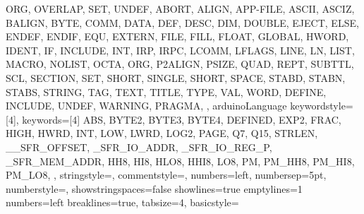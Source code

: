 {{                ORG, OVERLAP,
                SET,
                UNDEF, 
                ABORT, ALIGN, APP-FILE, ASCII, ASCIZ, 
                BALIGN, BYTE, 
                COMM, 
                DATA, DEF, DESC, DIM, DOUBLE, 
                EJECT, ELSE, ENDEF, ENDIF, EQU, EXTERN, 
                FILE, FILL, FLOAT, 
                GLOBAL, 
                HWORD,
                IDENT, IF, INCLUDE, INT, IRP, IRPC, 
                LCOMM, LFLAGS, LINE, LN, LIST, 
                MACRO,
                NOLIST, 
                OCTA, ORG, 
                P2ALIGN, PSIZE, 
                QUAD, 
                REPT, 
                SUBTTL, SCL, SECTION, SET, SHORT, 
                SINGLE, SHORT, SPACE, STABD, STABN, 
                STABS, STRING, 
                TAG, TEXT, TITLE, TYPE, 
                VAL, 
                WORD,
                DEFINE, INCLUDE, UNDEF, WARNING, PRAGMA, 
                },      arduinoLanguage
%
%
  keywordstyle=[4]\color{arduinoGreen},
  keywords=[4]{  %
                ABS, 
                BYTE2, BYTE3, BYTE4, 
                DEFINED,
                EXP2,
                FRAC, 
                HIGH, HWRD, 
                INT,
                LOW, LWRD, LOG2, 
                PAGE, 
                Q7, Q15, 
                STRLEN,
                __SFR_OFFSET, _SFR_IO_ADDR, _SFR_IO_REG_P,
                _SFR_MEM_ADDR,
                HH8, HI8, HLO8, HHI8,
                LO8,
                PM, PM_HH8, PM_HI8, PM_LO8,
                },      
%
%
  stringstyle=\color{arduinoDarkBlue},    
  commentstyle=\color{arduinoGrey},    
%          
%   
  numbers=left,                    
  numbersep=5pt,                   
  numberstyle=\color{arduinoGrey}, 
  showstringspaces=false
  showlines=true
  emptylines=1
  numbers=left   
%
%
  breaklines=true,                    %
  tabsize=4,         
  basicstyle=\ttfamily  
}
